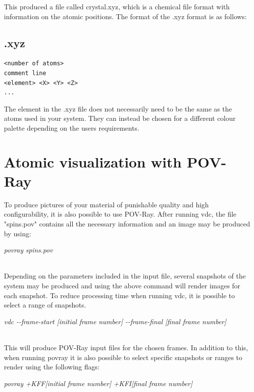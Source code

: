 This produced a file called crystal.xyz, which is a chemical file format with information on the atomic positions. The format of the .xyz format is as follows:\\

\subsection*{.xyz}
{\footnotesize
\begin{verbatim}
<number of atoms>
comment line
<element> <X> <Y> <Z>
...
\end{verbatim}
}

The element in the .xyz file does not necessarily need to be the same as the atoms used in your system. They can instead be chosen for a different colour palette depending on the users requirements.

\section*{Atomic visualization with POV-Ray}

To produce pictures of your material of punishable quality and high configurability, it is also possible to use POV-Ray. After running vdc, the file "spins.pov" contains all the necessary information and an image may be produced by using:

\begin{minipage}[c]{\textwidth}
\centering
\textit{povray spins.pov}
\end{minipage}\\

Depending on the parameters included in the input file, several snapshots of the system may be produced and using the above command will render images for each snapshot. To reduce processing time when running vdc, it is possible to select a range of snapshots.

\begin{minipage}[c]{\textwidth}
\centering
\textit{vdc -{}-frame-start [initial frame number] -{}-frame-final [final frame number]}
\end{minipage}\\

This will produce POV-Ray input files for the chosen frames. In addition to this, when running povray it is also possible to select specific snapshots or ranges to render using the following flags:

\begin{minipage}[c]{\textwidth}
\centering
\textit{povray +KFF[initial frame number] +KFI[final frame number]}
\end{minipage}\\

